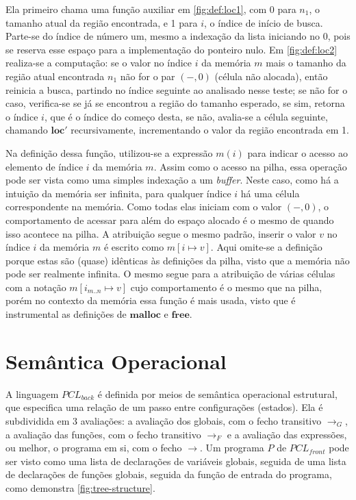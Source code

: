 \noindent Ela primeiro chama uma função auxiliar em \ref{fig:def:loc1}, com 0 para $n_1$, o tamanho atual da região encontrada,  e 1 para $i$, o índice de início de busca. Parte-se do índice de número um, mesmo a indexação da lista iniciando no 0, pois se reserva esse espaço para a implementação do ponteiro nulo. Em \ref{fig:def:loc2} realiza-se a computação: se o valor no índice $i$ da memória $m$ mais o tamanho da região atual encontrada $n_1$ não for o par $(-,0)$ (célula não alocada), então reinicia a busca, partindo no índice seguinte ao analisado nesse teste; se não for o caso, verifica-se se já se encontrou a região do tamanho esperado, se sim, retorna o índice $i$, que é o índice do começo desta, se não, avalia-se a célula seguinte, chamando $\mathbf{loc}'$ recursivamente, incrementando o valor da região encontrada em 1.

Na definição dessa função, utilizou-se a expressão $m(i)$ para indicar o acesso ao elemento de índice $i$ da memória $m$. Assim como o acesso na pilha, essa operação pode ser vista como uma simples indexação a um \emph{buffer}. Neste caso, como há a intuição da memória ser infinita, para qualquer índice $i$ há uma célula correspondente na memória. Como todas elas iniciam com o valor $(-,0)$, o comportamento de acessar para além do espaço alocado é o mesmo de quando isso acontece na pilha. A atribuição segue o mesmo padrão, inserir o valor $v$ no índice $i$ da memória $m$ é escrito como $m[i \mapsto v]$. Aqui omite-se a definição porque estas são (quase) idênticas às definições da pilha, visto que a memória não pode ser realmente infinita. O mesmo segue para a atribuição de várias células com a notação $m[i_{m..n} \mapsto v]$ cujo comportamento é o mesmo que na pilha, porém no contexto da memória essa função é mais usada, visto que é  instrumental as definições de $\mathbf{malloc}$ e $\mathbf{free}$.


\section{Semântica Operacional}
\label{sec:pcl-back:semantica}

A linguagem $PCL_{back}$ é definida por meios de semântica operacional estrutural, que especifica uma relação de um passo entre configurações (estados). Ela é subdividida em 3 avaliações: a avaliação dos globais, com o fecho transitivo $\to_G$, a avaliação das funções, com o fecho transitivo $\to_F$ e a avaliação das expressões, ou melhor, o programa em si, com o fecho $\to$. Um programa $P$ de $PCL_{front}$ pode ser visto como uma lista de declarações de variáveis globais, seguida de uma lista de declarações de funções globais, seguida da função de entrada do programa, como demonstra \ref{fig:tree-structure}.

